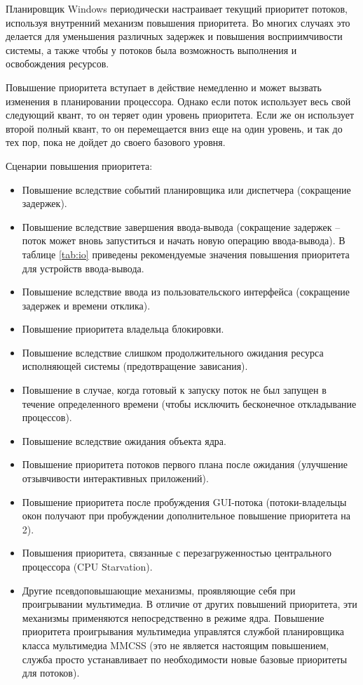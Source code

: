 Планировщик Windows периодически настраивает текущий приоритет потоков, используя внутренний механизм повышения приоритета. Во многих случаях это делается для уменьшения различных задержек и повышения восприимчивости системы, а также чтобы у потоков была возможность выполнения и освобождения ресурсов.  


Повышение приоритета вступает в действие немедленно и может  вызвать изменения в планировании процессора. Однако если поток использует весь свой следующий квант, то он теряет один уровень приоритета. Если же он использует второй полный квант, то он перемещается вниз еще  на один уровень, и так до тех пор, пока не дойдет до своего базового уровня. 

Сценарии повышения приоритета:
\begin{itemize}
	\item Повышение вследствие событий планировщика или диспетчера (сокращение задержек).
	\item Повышение вследствие завершения ввода-вывода (сокращение задержек -- поток может вновь запуститься и начать новую операцию ввода-вывода). В таблице \ref{tab:io} приведены рекомендуемые значения повышения приоритета для устройств ввода-вывода.
	\item Повышение вследствие ввода из пользовательского интерфейса (сокращение задержек и времени отклика).
	\item Повышение приоритета владельца блокировки.
	\item Повышение вследствие слишком продолжительного ожидания ресурса исполняющей системы (предотвращение зависания).
	\item Повышение в случае, когда готовый к запуску поток не был запущен в течение определенного времени (чтобы исключить бесконечное откладывание процессов).
	\item Повышение вследствие ожидания объекта ядра.
	\item Повышение приоритета потоков первого плана после ожидания (улучшение отзывчивости интерактивных приложений).
	\item Повышение приоритета после пробуждения GUI-потока (потоки-владельцы окон получают при пробуждении дополнительное повышение приоритета на 2).
	\item Повышения приоритета, связанные с перезагруженностью центрального процессора (CPU Starvation).
	\item Другие псевдоповышающие 	механизмы, проявляющие себя при проигрывании мультимедиа. В отличие от других повышений приоритета, эти механизмы применяются непосредственно в режиме ядра. Повышение приоритета проигрывания мультимедиа управлятся службой планировщика класса мультимедиа MMCSS (это не является настоящим повышением, служба просто устанавливает по необходимости новые базовые приоритеты для потоков).
\end{itemize}


